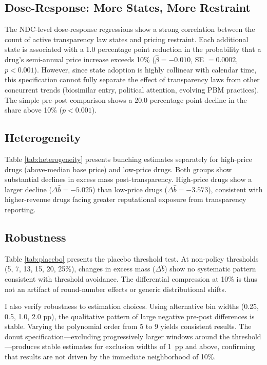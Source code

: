 \documentclass[12pt]{article}
\begin{document}
\subsection{Dose-Response: More States, More Restraint}

The NDC-level dose-response regressions show a strong correlation between the count of active transparency law states and pricing restraint. Each additional state is associated with a 1.0 percentage point reduction in the probability that a drug's semi-annual price increase exceeds 10\% ($\hat{\beta} = -0.010$, SE $= 0.0002$, $p < 0.001$). However, since state adoption is highly collinear with calendar time, this specification cannot fully separate the effect of transparency laws from other concurrent trends (biosimilar entry, political attention, evolving PBM practices). The simple pre-post comparison shows a 20.0 percentage point decline in the share above 10\% ($p < 0.001$).

\subsection{Heterogeneity}



Table \ref{tab:heterogeneity} presents bunching estimates separately for high-price drugs (above-median base price) and low-price drugs. Both groups show substantial declines in excess mass post-transparency. High-price drugs show a larger decline ($\Delta\hat{b} = -5.025$) than low-price drugs ($\Delta\hat{b} = -3.573$), consistent with higher-revenue drugs facing greater reputational exposure from transparency reporting.

\subsection{Robustness}



Table \ref{tab:placebo} presents the placebo threshold test. At non-policy thresholds (5, 7, 13, 15, 20, 25\%), changes in excess mass ($\Delta\hat{b}$) show no systematic pattern consistent with threshold avoidance. The differential compression at 10\% is thus not an artifact of round-number effects or generic distributional shifts.

I also verify robustness to estimation choices. Using alternative bin widths (0.25, 0.5, 1.0, 2.0 pp), the qualitative pattern of large negative pre-post differences is stable. Varying the polynomial order from 5 to 9 yields consistent results. The donut specification---excluding progressively larger windows around the threshold---produces stable estimates for exclusion widths of 1~pp and above, confirming that results are not driven by the immediate neighborhood of 10\%.
\end{document}

